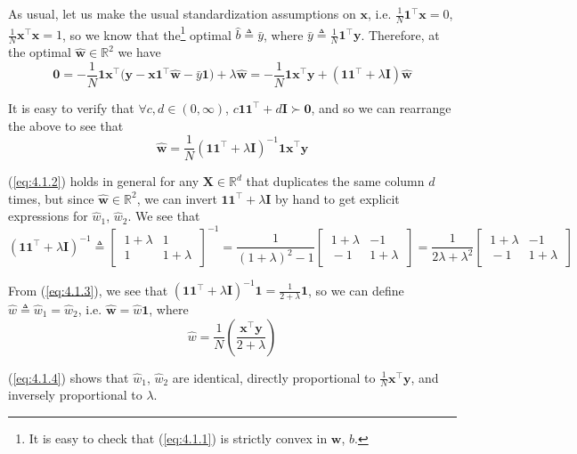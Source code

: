 \documentclass{article}
\numberwithin{equation}{section}
\begin{document}
As usual, let us make the usual standardization assumptions on $ \mathbf{x} $,
i.e. $ \frac{1}{N}\mathbf{1}^\top\mathbf{x} = 0 $,
$ \frac{1}{N}\mathbf{x}^\top\mathbf{x} = 1 $, so we know that the\footnote{
    It is easy to check that (\ref{eq:4.1.1}) is strictly convex in
    $ \mathbf{w} $, $ b $.
} optimal $ \hat{b} \triangleq \bar{y} $, where
$ \bar{y} \triangleq \frac{1}{N}\mathbf{1}^\top\mathbf{y} $. Therefore, at
the optimal $ \hat{\mathbf{w}} \in \mathbb{R}^2 $ we have
\begin{equation*}
    \mathbf{0} =
    -\frac{1}{N}\mathbf{1x}^\top\big(
        \mathbf{y} -  \mathbf{x1}^\top\hat{\mathbf{w}} - \bar{y}\mathbf{1}
    \big) +
    \lambda\hat{\mathbf{w}} =
    -\frac{1}{N}\mathbf{1x}^\top\mathbf{y} +
    \left(\mathbf{11}^\top + \lambda\mathbf{I}\right)\hat{\mathbf{w}}
\end{equation*}

It is easy to verify that $ \forall c, d \in (0, \infty) $,
$ c\mathbf{11}^\top + d\mathbf{I} \succ \mathbf{0} $, and so we can rearrange
the above to see that
\begin{equation} \label{eq:4.1.2}
    \hat{\mathbf{w}} =
    \frac{1}{N}\left(
        \mathbf{11}^\top + \lambda\mathbf{I}
    \right)^{-1}
    \mathbf{1x}^\top\mathbf{y}
\end{equation}

(\ref{eq:4.1.2}) holds in general for any $ \mathbf{X} \in \mathbb{R}^d $ that
duplicates the same column $ d $ times, but since
$ \hat{\mathbf{w}} \in \mathbb{R}^2 $, we can invert
$ \mathbf{11}^\top + \lambda\mathbf{I} $ by hand to get explicit expressions
for $ \hat{w}_1 $, $ \hat{w}_2 $. We see that
\begin{equation} \label{eq:4.1.3}
    \left(\mathbf{11}^\top + \lambda\mathbf{I}\right)^{-1} \triangleq
    \begin{bmatrix}
        \ 1 + \lambda & 1 \ \\ \ 1 & 1 + \lambda \
    \end{bmatrix}^{-1} =
    \frac{1}{(1 + \lambda)^2 - 1}
    \begin{bmatrix}
        \ 1 + \lambda & -1 \ \\ \ -1 & 1 + \lambda \
    \end{bmatrix} =
    \frac{1}{2\lambda + \lambda^2}
    \begin{bmatrix}
        \ 1 + \lambda & -1 \ \\ \ -1 & 1 + \lambda \
    \end{bmatrix}
\end{equation}

From (\ref{eq:4.1.3}), we see that $ \left(\mathbf{11}^\top +
\lambda\mathbf{I}\right)^{-1}\mathbf{1} = \frac{1}{2 + \lambda}\mathbf{1} $,
so we can define $ \hat{w} \triangleq \hat{w}_1 = \hat{w}_2 $, i.e.
$ \hat{\mathbf{w}} = \hat{w}\mathbf{1} $, where
\begin{equation} \label{eq:4.1.4}
    \hat{w} =
    \frac{1}{N}\left(\frac{\mathbf{x}^\top\mathbf{y}}{2 + \lambda}\right)
\end{equation}

(\ref{eq:4.1.4}) shows that $ \hat{w}_1 $, $ \hat{w}_2 $ are identical,
directly proportional to $ \frac{1}{N}\mathbf{x}^\top\mathbf{y} $, and
inversely proportional to $ \lambda $.
\end{document}
